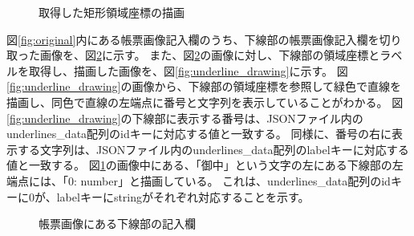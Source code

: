 \begin{figure}[t]
    \begin{center}
        \caption{取得した矩形領域座標の描画}
        \label{fig:rect_drawing}
    \end{center}
\end{figure}

図\ref{fig:original}内にある帳票画像記入欄のうち、下線部の帳票画像記入欄を切り取った画像を、図\ref{fig:underline_original}に示す。
また、図\ref{fig:underline_original}の画像に対し、下線部の領域座標とラベルを取得し、描画した画像を、図\ref{fig:underline_drawing}に示す。
図\ref{fig:underline_drawing}の画像から、下線部の領域座標を参照して緑色で直線を描画し、同色で直線の左端点に番号と文字列を表示していることがわかる。
図\ref{fig:underline_drawing}の下線部に表示する番号は、JSONファイル内のunderlines\_data配列のidキーに対応する値と一致する。
同様に、番号の右に表示する文字列は、JSONファイル内のunderlines\_data配列のlabelキーに対応する値と一致する。
図\ref{fig:rect_drawing}の画像中にある、「御中」という文字の左にある下線部の左端点には、「0: number」と描画している。
これは、underlines\_data配列のidキーに0が、labelキーにstringがそれぞれ対応することを示す。

\begin{figure}[t]
    \begin{center}
        \caption{帳票画像にある下線部の記入欄}
        \label{fig:underline_original}
    \end{center}
\end{figure}


